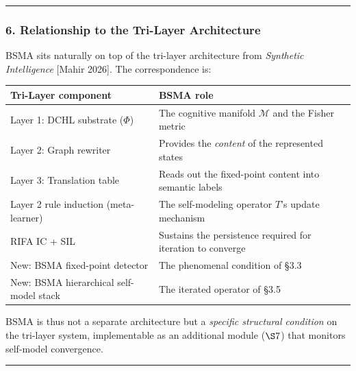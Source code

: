 \documentclass[
  11pt,
  a4paper,
]{article}
\begin{document}
\begin{center}\rule{0.5\linewidth}{0.5pt}\end{center}

\subsubsection{6. Relationship to the Tri-Layer
Architecture}\label{relationship-to-the-tri-layer-architecture}

BSMA sits naturally on top of the tri-layer architecture from
\emph{Synthetic Intelligence} {[}Mahir 2026{]}. The correspondence is:

\begin{longtable}[]{@{}
  >{\raggedright\arraybackslash}p{}
  >{\raggedright\arraybackslash}p{}@{}}
\toprule\noalign{}
\begin{minipage}[b]{\linewidth}\raggedright
Tri-Layer component
\end{minipage} & \begin{minipage}[b]{\linewidth}\raggedright
BSMA role
\end{minipage} \\
\midrule\noalign{}
\endhead
\bottomrule\noalign{}
\endlastfoot
Layer 1: DCHL substrate (\(\Phi\)) & The cognitive manifold
\(\mathcal{M}\) and the Fisher metric \\
Layer 2: Graph rewriter & Provides the \emph{content} of the represented
states \\
Layer 3: Translation table & Reads out the fixed-point content into
semantic labels \\
Layer 2 rule induction (meta-learner) & The self-modeling operator
\(T\)'s update mechanism \\
RIFA IC + SIL & Sustains the persistence required for iteration to
converge \\
New: BSMA fixed-point detector & The phenomenal condition of §3.3 \\
New: BSMA hierarchical self-model stack & The iterated operator of
§3.5 \\
\end{longtable}

BSMA is thus not a separate architecture but a \emph{specific structural
condition} on the tri-layer system, implementable as an additional
module (\(\S 7\)) that monitors self-model convergence.

\begin{center}\rule{0.5\linewidth}{0.5pt}\end{center}
\end{document}
